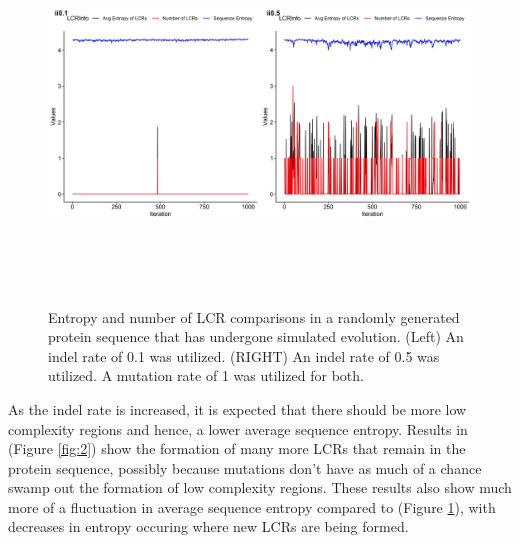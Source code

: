 \documentclass[10pt]{article}
\providecommand{\figref}[1]{(Figure \ref{#1})}  %
\begin{document}
\begin{figure}[H]
	\includegraphics[width=18cm, height=10cm]{im0.01-0.1-0.5.jpeg}
	\caption{Entropy and number of LCR comparisons in a randomly generated protein sequence that has undergone simulated evolution. (Left) An indel rate of 0.1 was utilized. (RIGHT) An indel rate of 0.5 was utilized. A mutation rate of 1 was utilized for both.}
	\label{fig:1}
\end{figure}

As the indel rate is increased, it is expected that there should be more low complexity regions and hence, a lower average sequence entropy. Results in \figref{fig:2} show the formation of many more LCRs that remain in the protein sequence, possibly because mutations don't have as much of a chance swamp out the formation of low complexity regions. These results also show much more of a fluctuation in average sequence entropy compared to \figref{fig:1}, with decreases in entropy occuring where new LCRs are being formed.
\end{document}
